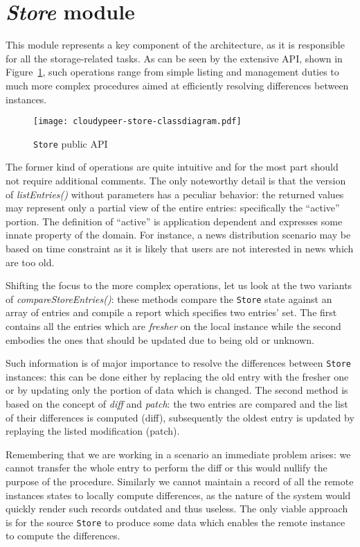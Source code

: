 \section{\textit{Store} module}
This module represents a key component of the \cloudypeer architecture,
as it is responsible for all the storage-related tasks. As can be seen
by the extensive API, shown in Figure~\ref{fig:cloudypeer-store-class}, such operations range from simple
listing and management duties to much more complex procedures aimed at
efficiently resolving differences between instances.

\begin{figure}[h!]
  \centering
  \texttt{[image: cloudypeer-store-classdiagram.pdf]}
  \caption{\texttt{Store} public API}
  \label{fig:cloudypeer-store-class}
\end{figure}

The former kind of operations are quite intuitive and for the most
part should not require additional comments. The only noteworthy
detail is that the version of \textit{listEntries()} without parameters
has a peculiar behavior: the returned values may represent only a
partial view of the entire entries: specifically the ``active''
portion. The definition of ``active'' is application dependent and
expresses some innate property of the domain. For instance, a news
distribution scenario may be based on time constraint as it is likely
that users are not interested in news which are too old.

Shifting the focus to the more complex operations, let us look at the
two variants of
\textit{compareStoreEntries()}: these methods compare the \texttt{Store}
state against an array of entries and compile a report which specifies
two entries' set. The first contains all the entries
which are \textit{fresher} on the local instance while the second embodies
the ones that should be updated due to being old or unknown.

Such information is of major importance to resolve the differences between
\texttt{Store} instances: this can be done either by replacing the old
entry with the fresher one or by updating only the portion of data
 which is changed. The second method is based on the
concept of \textit{diff} and \textit{patch}: the two entries are
compared and the list of their differences is computed (diff),
subsequently the oldest entry is updated by replaying the listed
modification (patch).

Remembering that we are working in a \ptop scenario an immediate
problem arises: we cannot transfer the whole entry to perform the
diff or this would nullify the purpose of the procedure. Similarly
we cannot maintain a record of all the remote instances states to
locally compute differences, as the
\ptop nature of the system would quickly render such records outdated
and thus useless. The only
viable approach is for the source \texttt{Store} to produce some data
which enables the remote instance to compute the differences.

